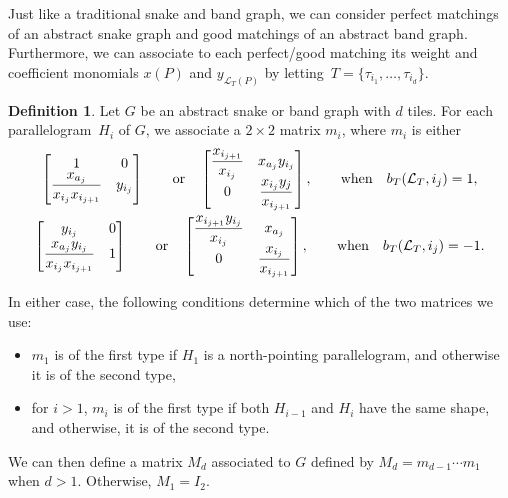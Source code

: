 \documentclass[pdftex]{sigma}
\numberwithin{equation}{section}
\theoremstyle{definition}
\newtheorem{Definition}[Theorem]{Definition}
\begin{document}
Just like a traditional snake and band graph, we can consider perfect matchings of an abstract snake graph and good matchings of an abstract band graph. Furthermore, we can associate to each perfect/good matching its weight and coefficient monomials $x(P)$ and $y_{\mathcal{L}_{T}(P)}$ by letting~${T=\{\tau_{i_1},\ldots,\tau_{i_d}\}}$.

\begin{Definition}\label{definition:tilematrix}
Let $G$ be an abstract snake or band graph with $d$ tiles. For each parallelogram~$H_i$ of $G$, we associate a $2\times 2$ matrix $m_i$, where $m_i$ is either
\begin{gather*}
\begin{bmatrix}
1 & 0\\
\dfrac{x_{a_j}}{x_{i_j}x_{i_{j+1}}} & y_{i_j}
\end{bmatrix}\qquad\text{or}\quad
\begin{bmatrix}
\dfrac{x_{i_{j+1}}}{x_{i_j}} & x_{a_j}y_{i_j}\\
0 & \dfrac{x_{i_j}y_j}{x_{i_{j+1}}}
\end{bmatrix},\qquad\text{when}\quad b_{T}(\mathcal{L}_{T}, i_j)=1,
\\
\begin{bmatrix}
y_{i_j} & 0\vspace{1mm}\\
\dfrac{x_{a_j}y_{i_j}}{x_{i_j}x_{i_{j+1}}} & 1
\end{bmatrix}\qquad\text{or}\quad
\begin{bmatrix}
\dfrac{x_{i_{j+1}}y_{i_j}}{x_{i_j}} & x_{a_j}\\
0 & \dfrac{x_{i_j}}{x_{i_{j+1}}}
\end{bmatrix},\qquad\text{when}\quad b_{T}(\mathcal{L}_{T}, i_j)=-1.
\end{gather*}

In either case, the following conditions determine which of the two matrices we use:
\begin{itemize}\itemsep=0pt
\item $m_1$ is of the first type if $H_1$ is a north-pointing parallelogram, and otherwise it is of the second type,
\item for $i>1$, $m_i$ is of the first type if both $H_{i-1}$ and $H_i$ have the same shape, and otherwise, it is of the second type.
\end{itemize}
We can then define a matrix $M_d$ associated to $G$ defined by $M_d=m_{d-1}\cdots m_1$ when $d>1$. Otherwise, $M_1=I_2$.
\end{Definition}
\end{document}
